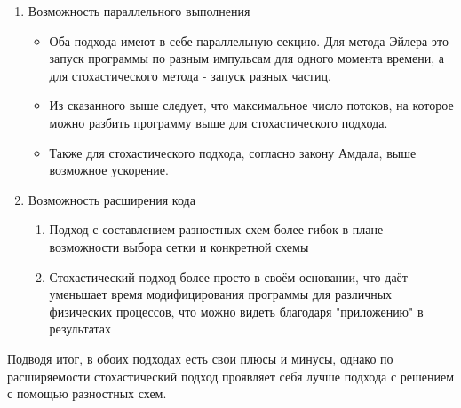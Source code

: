 \documentclass[a4paper,14pt]{extarticle} %
\begin{document}
\begin{enumerate}
\begin{itemize}
\end{itemize}
\item Возможность параллельного выполнения
\begin{itemize}
\item Оба подхода имеют в себе параллельную секцию. Для метода Эйлера это запуск программы по разным импульсам для одного момента времени, а для стохастического метода - запуск разных частиц.
\item Из сказанного выше следует, что максимальное число потоков, на которое можно разбить программу выше для стохастического подхода.
\item Также для стохастического подхода, согласно закону Амдала, выше возможное ускорение.
\end{itemize}
\item Возможность расширения кода
\begin{enumerate}
\item Подход с составлением разностных схем более гибок в плане возможности выбора сетки и конкретной схемы
\item Стохастический подход более просто в своём основании, что даёт уменьшает время модифицирования программы для различных физических процессов, что можно видеть благодаря "приложению" в результатах
\end{enumerate}
\end{enumerate}
Подводя итог, в обоих подходах есть свои плюсы и минусы, однако по расширяемости стохастический подход проявляет себя лучше подхода с решением с помощью разностных схем.



\end{document}
